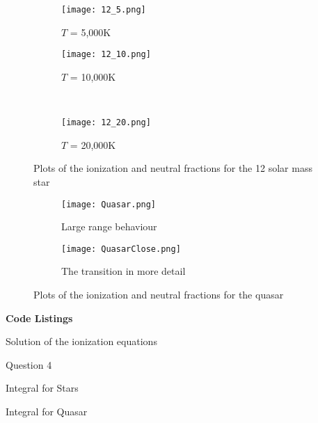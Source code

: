 \documentclass[12pt]{extarticle}
\begin{document}
\begin{figure}[h]
    \centering
    \begin{subfigure}[b]{0.53\textwidth}
        \texttt{[image: 12\_5.png]}
        \caption{$T$ = 5,000K}
        \label{figure:3a}
    \end{subfigure}  
    \qquad
    \begin{subfigure}[b]{0.53\textwidth}
        \texttt{[image: 12\_10.png]}
        \caption{$T$ = 10,000K}
        \label{figure:3b}
    \end{subfigure} 
    \\ 
    \begin{subfigure}[b]{0.53\textwidth}
        \texttt{[image: 12\_20.png]}
        \caption{$T$ = 20,000K}
        \label{figure:3c}
    \end{subfigure} 
    \caption{Plots of the ionization and neutral fractions for the 12 solar mass star}\label{figure 3}
\end{figure}

\begin{figure}[h]
    \centering
    \begin{subfigure}[b]{0.6\textwidth}
        \texttt{[image: Quasar.png]}
		\caption{Large range behaviour}
        \label{figure:4a}
    \end{subfigure}  
    \qquad
    \begin{subfigure}[b]{0.6\textwidth}
        \texttt{[image: QuasarClose.png]}
        \caption{The transition in more detail}
        \label{figure:4b}
    \end{subfigure} 
    \caption{Plots of the ionization and neutral fractions for the quasar} 
    \label{figure 4}
\end{figure}

    
\pagebreak
\FloatBarrier
\begin{center}
\textbf{Code Listings}
\end{center}

\begin{center}
Solution of the ionization equations
\end{center}


\begin{center}
Question 4
\end{center}


\begin{center}
Integral for Stars
\end{center}


\begin{center}
Integral for Quasar
\end{center}

\end{document}
